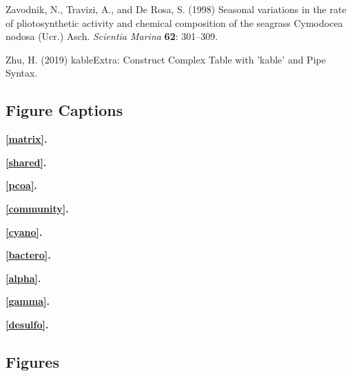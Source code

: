\documentclass[12pt,]{article}
\begin{document}
\leavevmode\hypertarget{ref-Zavodnik1998}{}%
Zavodnik, N., Travizi, A., and De Rosa, S. (1998) Seasonal variations in
the rate of pliotosynthetic activity and chemical composition of the
seagrass Cymodocea nodosa (Ucr.) Asch. \emph{Scientia Marina}
\textbf{62}: 301--309.

\leavevmode\hypertarget{ref-Zhu2019}{}%
Zhu, H. (2019) kableExtra: Construct Complex Table with 'kable' and Pipe
Syntax.

\newpage 
\setlength\parindent{0pt}

\hypertarget{figure-captions}{%
\subsection{Figure Captions}\label{figure-captions}}

\textbf{\autoref{matrix}.} 

\textbf{\autoref{shared}.} 

\textbf{\autoref{pcoa}.} 

\textbf{\autoref{community}.} 

\textbf{\autoref{cyano}.} 

\textbf{\autoref{bactero}.} 

\textbf{\autoref{alpha}.} 

\textbf{\autoref{gamma}.} 

\textbf{\autoref{desulfo}.} 

\hypertarget{figures}{%
\subsection{Figures}\label{figures}}
\end{document}
